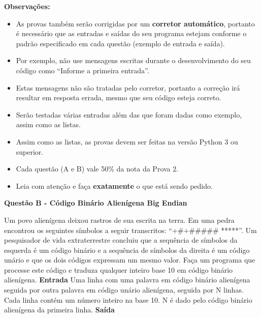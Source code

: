 \documentclass[a4paper, 12pt]{article}
\begin{document}
\textbf{{\large Observações:}}
\begin{itemize}
	\item As provas também serão corrigidas por um \textbf{corretor automático}, portanto é necessário que as entradas e saídas do seu programa estejam conforme o padrão especificado em cada questão (exemplo de entrada e saída). \item Por exemplo, não use mensagens escritas durante o desenvolvimento do seu código como “Informe a primeira entrada”.
	\item Estas mensagens não são tratadas pelo corretor, portanto a correção irá resultar em resposta errada, mesmo que seu código esteja correto.
	\item Serão testadas várias entradas além das que foram dadas como exemplo, assim como as listas.
	\item Assim como as listas, as provas devem ser feitas na versão Python 3 ou superior.
	\item Cada questão (A e B) vale 50\% da nota da Prova 2.
	\item Leia com atenção e faça \textbf{exatamente} o que está sendo pedido.
\end{itemize}
\newpage %
\begin{center}
\textbf{{\Large Questão B - Código Binário Alienígena Big Endian}}
\end{center}
\vspace{5pt}
Um povo alienígena deixou rastros de sua escrita na terra. Em uma pedra encontrou os seguintes símbolos a seguir transcritos: “+#+##### *****”. Um pesquisador de vida extraterrestre concluiu que a sequência de símbolos da esquerda é um código binário e a sequência de símbolos da direita é um código unário e que os dois códigos expressam um mesmo valor.
\newline Faça um programa que processe este código e traduza qualquer inteiro base 10 em código binário alienígena.
\newline \newline
\textbf{{\large Entrada}} \newline
Uma linha com uma palavra em código binário alienígena seguida por outra palavra em código unário alienígena, seguida por N linhas. 
\newline Cada linha contém um número inteiro na base 10. N é dado pelo código binário alienígena da primeira linha.
\newline \newline
\textbf{{\large Saída}} \newline
\end{document}
